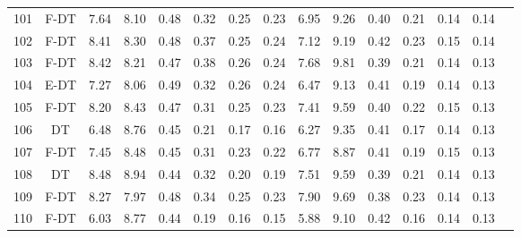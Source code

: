 \begin{longtable}{@{\hskip3pt}c@{\hskip3pt}c@{\hskip3pt}c@{\hskip3pt}c@{\hskip3pt}c@{\hskip3pt}c@{\hskip3pt}c@{\hskip3pt}c@{\hskip3pt}c@{\hskip3pt}c@{\hskip3pt}c@{\hskip3pt}c@{\hskip3pt}c@{\hskip3pt}c@{\hskip3pt}c}
        101 &           F-DT &              7.64 &        8.10 &          0.48 &        0.32 &        0.25 &         0.23 &                6.95 &        9.26 &          0.40 &        0.21 &        0.14 &         0.14 \\
        102 &           F-DT &              8.41 &        8.30 &          0.48 &        0.37 &        0.25 &         0.24 &                7.12 &        9.19 &          0.42 &        0.23 &        0.15 &         0.14 \\
        103 &           F-DT &              8.42 &        8.21 &          0.47 &        0.38 &        0.26 &         0.24 &                7.68 &        9.81 &          0.39 &        0.21 &        0.14 &         0.13 \\
        104 &           E-DT &              7.27 &        8.06 &          0.49 &        0.32 &        0.26 &         0.24 &                6.47 &        9.13 &          0.41 &        0.19 &        0.14 &         0.13 \\
        105 &           F-DT &              8.20 &        8.43 &          0.47 &        0.31 &        0.25 &         0.23 &                7.41 &        9.59 &          0.40 &        0.22 &        0.15 &         0.13 \\
        106 &             DT &              6.48 &        8.76 &          0.45 &        0.21 &        0.17 &         0.16 &                6.27 &        9.35 &          0.41 &        0.17 &        0.14 &         0.13 \\
        107 &           F-DT &              7.45 &        8.48 &          0.45 &        0.31 &        0.23 &         0.22 &                6.77 &        8.87 &          0.41 &        0.19 &        0.15 &         0.13 \\
        108 &             DT &              8.48 &        8.94 &          0.44 &        0.32 &        0.20 &         0.19 &                7.51 &        9.59 &          0.39 &        0.21 &        0.14 &         0.13 \\
        109 &           F-DT &              8.27 &        7.97 &          0.48 &        0.34 &        0.25 &         0.23 &                7.90 &        9.69 &          0.38 &        0.23 &        0.14 &         0.13 \\
        110 &           F-DT &              6.03 &        8.77 &          0.44 &        0.19 &        0.16 &         0.15 &                5.88 &        9.10 &          0.42 &        0.16 &        0.14 &         0.13 \\

\end{longtable}

